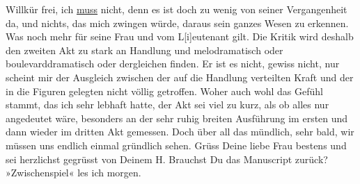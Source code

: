               Willkür frei, ich \uline{muss} nicht, denn es ist doch zu
               wenig von seiner Vergangenheit da, und nichts, das mich zwingen würde, daraus sein
               ganzes Wesen zu erkennen. Was noch mehr für seine Frau und vom L{[}i{]}eutenant gilt. Die
               Kritik wird deshalb den zweiten Akt zu stark an Handlung und melodramatisch oder
               boulevarddramatisch oder dergleichen finden. Er ist es nicht, gewiss nicht, nur
               scheint mir der Ausgleich zwischen der auf die Handlung verteilten Kraft und der in
               die Figuren gelegten nicht völlig getroffen. Woher auch wohl das Gefühl stammt, das
               ich sehr lebhaft hatte, der Akt sei viel zu kurz, als ob alles nur angedeutet wäre,
               besonders an der sehr ruhig breiten Ausführung im ersten und dann wieder im dritten
               Akt gemessen. Doch über all das mündlich, sehr bald, wir müssen uns endlich einmal
               gründlich sehen. Grüss Deine liebe Frau bestens und sei herzlichst gegrüsst von Deinem\pend
           \pstart \spacefill\mbox{H.}\pend{}
\pstart
           \noindent{}Brauchst Du das Manuscript zurück? »Zwischenspiel« les ich morgen.\pend
           \endnumbering{}  \newcommand{\dateiname}{L01548}\newcommand{\titel}{Hermann Bahr an Arthur Schnitzler, 17. 9. 1905}\newcommand{\editorInnen}{Herausgegeben von Martin Anton Müller}
